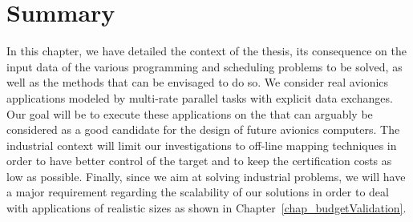 \documentclass[main.tex]{subfiles}
\begin{document}
\section{Summary}
In this chapter, we have detailed the context of the thesis, its consequence on the input data of the various programming and scheduling problems to be solved, as well as the methods that can be envisaged to do so. We consider real avionics applications modeled by multi-rate parallel tasks with explicit data exchanges. Our goal will be to execute these applications on the \mppalong that can arguably be considered as a good candidate for the design of future avionics computers.
The industrial context will limit our investigations to off-line mapping techniques in order to have better control of the target and to keep the certification costs as low as possible. Finally, since we aim at solving industrial problems, we will have a major requirement regarding the scalability of our solutions in order to deal with applications of realistic sizes as shown in Chapter~\ref{chap_budgetValidation}.



\clearpage
\subbiblio
\end{document}
